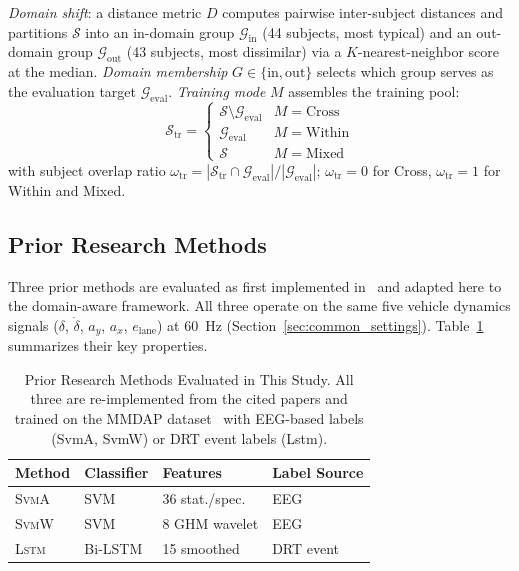\documentclass[lettersize,journal]{IEEEtran}
\newcommand{\Impl}[1]{\textsc{#1}}
\begin{document}
\emph{Domain shift}: a distance metric $D$ computes pairwise inter-subject distances and partitions $\mathcal{S}$ into an in-domain group $\mathcal{G}_{\mathrm{in}}$ (44 subjects, most typical) and an out-domain group $\mathcal{G}_{\mathrm{out}}$ (43 subjects, most dissimilar) via a $K$-nearest-neighbor score at the median.
\emph{Domain membership} $G \in \{\mathrm{in}, \mathrm{out}\}$ selects which group serves as the evaluation target $\mathcal{G}_{\mathrm{eval}}$.
\emph{Training mode} $M$ assembles the training pool:
\begin{equation}
\label{eq:train_pool}
\mathcal{S}_{\mathrm{tr}} =
\begin{cases}
\mathcal{S} \setminus \mathcal{G}_{\mathrm{eval}} & M = \mathrm{Cross} \\
\mathcal{G}_{\mathrm{eval}}                       & M = \mathrm{Within} \\
\mathcal{S}                                       & M = \mathrm{Mixed}
\end{cases}
\end{equation}
with subject overlap ratio $\omega_{\mathrm{tr}} = |\mathcal{S}_{\mathrm{tr}} \cap \mathcal{G}_{\mathrm{eval}}| / |\mathcal{G}_{\mathrm{eval}}|$; $\omega_{\mathrm{tr}} = 0$ for Cross, $\omega_{\mathrm{tr}} = 1$ for Within and Mixed.

\subsection{Prior Research Methods}
\label{sec:prior_methods}

Three prior methods are evaluated as first implemented in~\cite{nakagama2025iv} and adapted here to the domain-aware framework.
All three operate on the same five vehicle dynamics signals ($\delta$, $\dot{\delta}$, $a_y$, $a_x$, $e_{\text{lane}}$) at 60~Hz (Section~\ref{sec:common_settings}).
Table~\ref{tab:prior_methods} summarizes their key properties.

\begin{table}[!t]
\caption{Prior Research Methods Evaluated in This Study. All three are re-implemented from the cited papers and trained on the MMDAP dataset~\cite{aygun2024} with EEG-based labels (SvmA, SvmW) or DRT event labels (Lstm).\label{tab:prior_methods}}
\centering
\footnotesize
\begin{tabular}{|l|l|l|l|}
\hline
Method & Classifier & Features & Label Source \\
\hline
\Impl{SvmA}~\cite{arefnezhad2019} & SVM & 36 stat./spec. & EEG \\
\hline
\Impl{SvmW}~\cite{zhao2012}       & SVM & 8 GHM wavelet & EEG \\
\hline
\Impl{Lstm}~\cite{wang2022}       & Bi-LSTM & 15 smoothed & DRT event \\
\hline
\end{tabular}
\end{table}
\end{document}
